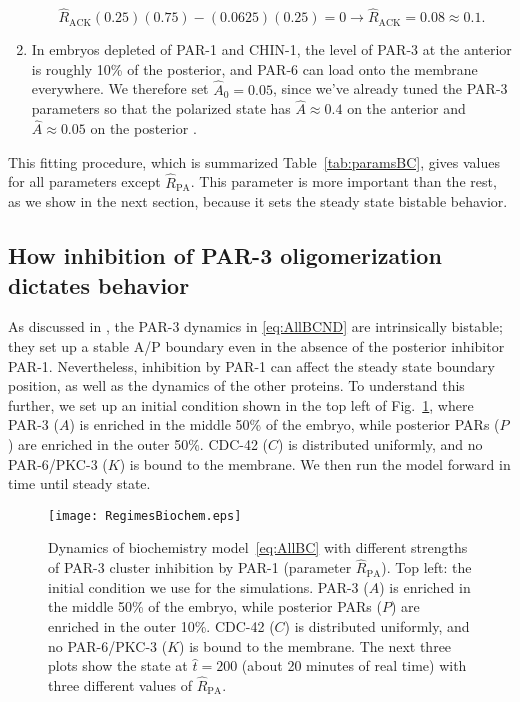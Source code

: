 \documentclass[11pt]{article}
\newcommand{\6}[1]{#1_{\text{6}}}
\newcommand{\3}[1]{#1_{\text{3}}}
\begin{document}
\begin{enumerate}
\begin{equation*}
\hat{R}_\text{ACK}(0.25)(0.75)- (0.0625)(0.25)=0 \rightarrow \hat{R}_\text{ACK}=0.08\approx 0.1.
\end{equation*}
\item In embryos depleted of PAR-1 and CHIN-1, the level of PAR-3 at the anterior is roughly 10\% of the posterior, and PAR-6 can load onto the membrane everywhere. We therefore set $\hat A_0=0.05$, since we've already tuned the PAR-3 parameters so that the polarized state has $\hat A \approx 0.4$ on the anterior and $\hat A \approx 0.05$ on the posterior \cite{lang2023oligomerization}.
\end{enumerate}
This fitting procedure, which is summarized Table\ \ref{tab:paramsBC}, gives values for all parameters except $\hat R_\text{PA}$. This parameter is more important than the rest, as we show in the next section, because it sets the steady state bistable behavior.

\subsection{How inhibition of PAR-3 oligomerization dictates behavior}
As discussed in \cite{lang2023oligomerization}, the PAR-3 dynamics in \eqref{eq:AllBCND} are intrinsically bistable; they set up a stable A/P boundary even in the absence of the posterior inhibitor PAR-1. Nevertheless, inhibition by PAR-1 can affect the steady state boundary position, as well as the dynamics of the other proteins.  To understand this further, we set up an initial condition shown in the top left of Fig.\ \ref{fig:BCRegimes}, where PAR-3 ($A$) is enriched in the middle 50\% of the embryo, while posterior PARs ($P$) are enriched in the outer 50\%. CDC-42 ($C$) is distributed uniformly, and no PAR-6/PKC-3 ($K$) is bound to the membrane. We then run the model forward in time until steady state.

\begin{figure}
\centering
\texttt{[image: RegimesBiochem.eps]}
\caption{\label{fig:BCRegimes}Dynamics of biochemistry model\ \eqref{eq:AllBC} with different strengths of PAR-3 cluster inhibition by PAR-1 (parameter $\hat R_\text{PA}$). Top left: the initial condition we use for the simulations. PAR-3 ($A$) is enriched in the middle 50\% of the embryo, while posterior PARs ($P$) are enriched in the outer 10\%. CDC-42 ($C$) is distributed uniformly, and no PAR-6/PKC-3 ($K$) is bound to the membrane. The next three plots show the state at $\hat t = 200$ (about 20 minutes of real time) with three different values of $\hat R_\text{PA}$. }
\end{figure}
\end{document}
